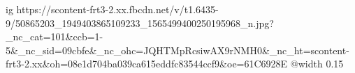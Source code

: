  
 
 
 
 

\par
\ifcmt
  ig https://scontent-frt3-2.xx.fbcdn.net/v/t1.6435-9/50865203_1949403865109233_1565499400250195968_n.jpg?_nc_cat=101&ccb=1-5&_nc_sid=09cbfe&_nc_ohc=JQHTMpRcsiwAX9rNMH0&_nc_ht=scontent-frt3-2.xx&oh=08e1d704ba039ca615eddfc83544ccf9&oe=61C6928E
  @width 0.15
\fi

